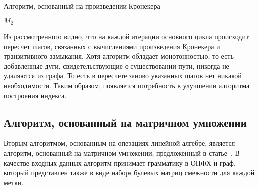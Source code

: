\begin{algorithm}[H]
\begin{algorithmic}[1]
\caption{Алгоритм, основанный на произведении Кронекера}
\label{tensor:cfpq}
    
    \EndFor
    
            \EndFor
        \EndFor
    \EndFor
                    \EndFor
                \EndIf
           \EndFor
        \EndFor
    \EndWhile
\State \Return $M_2$
\EndFunction
\end{algorithmic}
\end{algorithm}

Из рассмотренного видно, что на каждой итерации основного цикла происходит пересчет шагов, связанных с вычислениями произведения Кронекера и транзитивного замыкания. Хотя алгоритм обладает монотонностью, то есть добавленные дуги, свидетельствующие о существовании пути, никогда не удаляются из графа. То есть в пересчете заново указанных шагов нет никакой необходимости. Таким образом, появляется потребность в улучшении алгоритма построения индекса.

\subsection{Алгоритм, основанный на матричном умножении}

Вторым алгоритмом, основанным на операциях линейной алгебре, является алгоритм, основанный на матричном умножении, предложенный в статье~\cite{alg_matrix}. В качестве входных данных алгоритм принимает грамматику в ОНФХ и граф, который представлен также в виде набора булевых матриц смежности для каждой метки.

